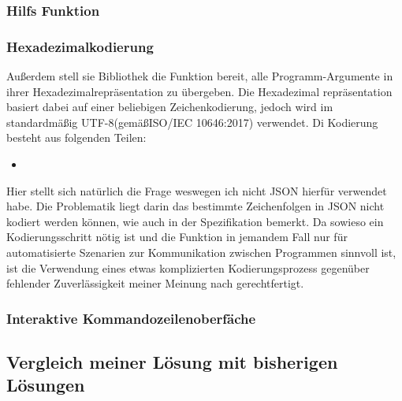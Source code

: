 \subsubsection{Hilfs Funktion}
\subsubsection{Hexadezimalkodierung}\label{Hexadecimalencoding}
Au\ss erdem stell sie Bibliothek die Funktion bereit, alle Programm-Argumente in ihrer Hexadezimalrepräsentation zu übergeben.
Die Hexadezimal repräsentation basiert dabei auf einer beliebigen Zeichenkodierung, jedoch wird im standardmä\ss ig UTF-8(gemä\ss ISO/IEC 10646:2017) verwendet.
Di Kodierung besteht aus folgenden Teilen:
\begin{itemize}
 \item 
\end{itemize}

Hier stellt sich natürlich die Frage weswegen ich nicht JSON hierfür verwendet habe.
Die Problematik liegt darin das bestimmte Zeichenfolgen in JSON nicht kodiert werden können, wie auch in der Spezifikation bemerkt.\cite{JSONSpec}
Da sowieso ein Kodierungsschritt nötig ist und die Funktion in jemandem Fall nur für automatisierte Szenarien zur Kommunikation zwischen Programmen sinnvoll ist,
ist die Verwendung eines etwas komplizierten Kodierungsprozess gegenüber fehlender Zuverlässigkeit meiner Meinung nach gerechtfertigt. 
\subsubsection{Interaktive Kommandozeilenoberfäche}
\subsection{Vergleich meiner Lösung mit bisherigen Lösungen}\label{subsec:Comparison}